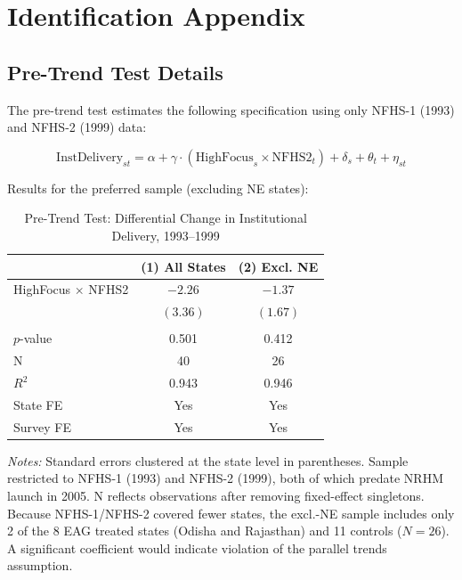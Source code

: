 \documentclass[12pt]{article}
\begin{document}
\section{Identification Appendix}
\label{sec:app_id}

\subsection{Pre-Trend Test Details}

The pre-trend test estimates the following specification using only NFHS-1 (1993) and NFHS-2 (1999) data:

\begin{equation}
\text{InstDelivery}_{st} = \alpha + \gamma \cdot (\text{HighFocus}_s \times \text{NFHS2}_t) + \delta_s + \theta_t + \eta_{st}
\end{equation}

Results for the preferred sample (excluding NE states):

\begin{table}[H]
\centering
\caption{Pre-Trend Test: Differential Change in Institutional Delivery, 1993--1999}
\label{tab:pretrend}
\begin{threeparttable}
\begin{tabular}{lcc}
\toprule
 & (1) All States & (2) Excl. NE \\
\midrule
HighFocus $\times$ NFHS2 & $-2.26$ & $-1.37$ \\
 & $(3.36)$ & $(1.67)$ \\
\\
$p$-value & 0.501 & 0.412 \\
N & 40 & 26 \\
$R^2$ & 0.943 & 0.946 \\
\midrule
State FE & Yes & Yes \\
Survey FE & Yes & Yes \\
\bottomrule
\end{tabular}
\begin{tablenotes}[flushleft]
\small
\item \textit{Notes:} Standard errors clustered at the state level in parentheses. Sample restricted to NFHS-1 (1993) and NFHS-2 (1999), both of which predate NRHM launch in 2005. N reflects observations after removing fixed-effect singletons. Because NFHS-1/NFHS-2 covered fewer states, the excl.-NE sample includes only 2 of the 8 EAG treated states (Odisha and Rajasthan) and 11 controls ($N=26$). A significant coefficient would indicate violation of the parallel trends assumption.
\end{tablenotes}
\end{threeparttable}
\end{table}
\end{document}
